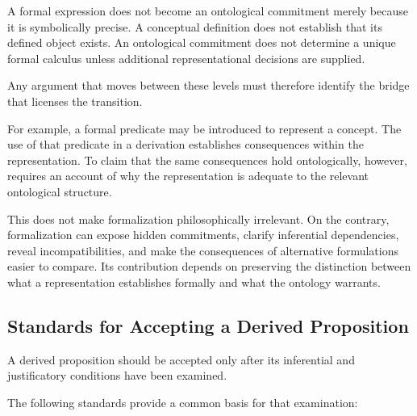 A formal expression does not become an ontological commitment
merely because it is symbolically precise. A conceptual definition
does not establish that its defined object exists. An ontological
commitment does not determine a unique formal calculus unless
additional representational decisions are supplied.

Any argument that moves between these levels must therefore
identify the bridge that licenses the transition.

For example, a formal predicate may be introduced to represent
a concept. The use of that predicate in a derivation establishes
consequences within the representation. To claim that the same
consequences hold ontologically, however, requires an account
of why the representation is adequate to the relevant ontological
structure.

This does not make formalization philosophically irrelevant.
On the contrary, formalization can expose hidden commitments,
clarify inferential dependencies, reveal incompatibilities, and
make the consequences of alternative formulations easier to
compare. Its contribution depends on preserving the distinction
between what a representation establishes formally and what
the ontology warrants.

\subsection{Standards for Accepting a Derived Proposition}

A derived proposition should be accepted only after its inferential
and justificatory conditions have been examined.

The following standards provide a common basis for that
examination:


